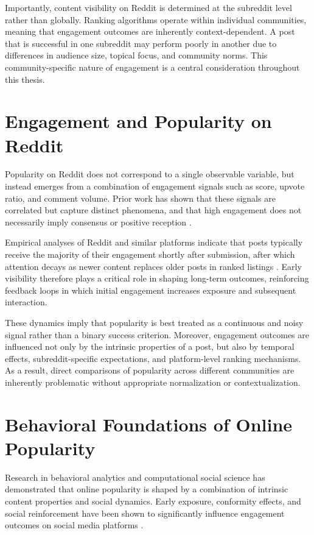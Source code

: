 Importantly, content visibility on Reddit is determined at the subreddit level rather than globally. Ranking algorithms operate within individual communities, meaning that engagement outcomes are inherently context-dependent. A post that is successful in one subreddit may perform poorly in another due to differences in audience size, topical focus, and community norms.\cite{chandrasekharan2018internet, zhang2017community, hamilton2017loyalty} This community-specific nature of engagement is a central consideration throughout this thesis.


\section{Engagement and Popularity on Reddit}

Popularity on Reddit does not correspond to a single observable variable, but instead emerges from a combination of engagement signals such as score, upvote ratio, and comment volume. Prior work has shown that these signals are correlated but capture distinct phenomena, and that high engagement does not necessarily imply consensus or positive reception \cite{hessel2019something}.

Empirical analyses of Reddit and similar platforms indicate that posts typically receive the majority of their engagement shortly after submission, after which attention decays as newer content replaces older posts in ranked listings \cite{terentiev2014predicting,wigsnes2019predicting}. Early visibility therefore plays a critical role in shaping long-term outcomes, reinforcing feedback loops in which initial engagement increases exposure and subsequent interaction.

These dynamics imply that popularity is best treated as a continuous and noisy signal rather than a binary success criterion. Moreover, engagement outcomes are influenced not only by the intrinsic properties of a post, but also by temporal effects, subreddit-specific expectations, and platform-level ranking mechanisms. As a result, direct comparisons of popularity across different communities are inherently problematic without appropriate normalization or contextualization.

\section{Behavioral Foundations of Online Popularity}

Research in behavioral analytics and computational social science has demonstrated that online popularity is shaped by a combination of intrinsic content properties and social dynamics. Early exposure, conformity effects, and social reinforcement have been shown to significantly influence engagement outcomes on social media platforms \cite{stoddard2015popularity,waller2021quantifying}.

